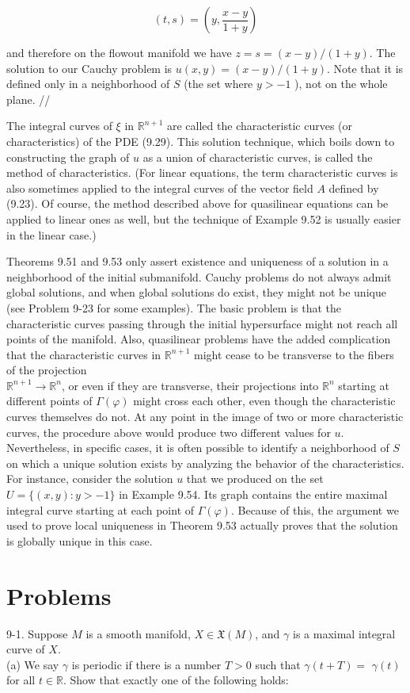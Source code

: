 \documentclass[10pt]{article}
\begin{document}
$$
(t, s)=\left(y, \frac{x-y}{1+y}\right)
$$

and therefore on the flowout manifold we have $z=s=(x-y) /(1+y)$. The solution to our Cauchy problem is $u(x, y)=(x-y) /(1+y)$. Note that it is defined only in a neighborhood of $S$ (the set where $y>-1$ ), not on the whole plane. //

The integral curves of $\xi$ in $\mathbb{R}^{n+1}$ are called the characteristic curves (or characteristics) of the PDE (9.29). This solution technique, which boils down to constructing the graph of $u$ as a union of characteristic curves, is called the method of characteristics. (For linear equations, the term characteristic curves is also sometimes applied to the integral curves of the vector field $A$ defined by (9.23). Of course, the method described above for quasilinear equations can be applied to linear ones as well, but the technique of Example 9.52 is usually easier in the linear case.)

Theorems 9.51 and 9.53 only assert existence and uniqueness of a solution in a neighborhood of the initial submanifold. Cauchy problems do not always admit global solutions, and when global solutions do exist, they might not be unique (see Problem 9-23 for some examples). The basic problem is that the characteristic curves passing through the initial hypersurface might not reach all points of the manifold. Also, quasilinear problems have the added complication that the characteristic curves in $\mathbb{R}^{n+1}$ might cease to be transverse to the fibers of the projection\\
$\mathbb{R}^{n+1} \rightarrow \mathbb{R}^{n}$, or even if they are transverse, their projections into $\mathbb{R}^{n}$ starting at different points of $\Gamma(\varphi)$ might cross each other, even though the characteristic curves themselves do not. At any point in the image of two or more characteristic curves, the procedure above would produce two different values for $u$. Nevertheless, in specific cases, it is often possible to identify a neighborhood of $S$ on which a unique solution exists by analyzing the behavior of the characteristics. For instance, consider the solution $u$ that we produced on the set $U=\{(x, y): y>-1\}$ in Example 9.54. Its graph contains the entire maximal integral curve starting at each point of $\Gamma(\varphi)$. Because of this, the argument we used to prove local uniqueness in Theorem 9.53 actually proves that the solution is globally unique in this case.

\section*{Problems}
9-1. Suppose $M$ is a smooth manifold, $X \in \mathfrak{X}(M)$, and $\gamma$ is a maximal integral curve of $X$.\\
(a) We say $\gamma$ is periodic if there is a number $T>0$ such that $\gamma(t+T)=$ $\gamma(t)$ for all $t \in \mathbb{R}$. Show that exactly one of the following holds:
\end{document}
